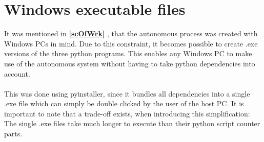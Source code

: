 \section{Windows executable files}
\label{exe}
It was mentioned in \textbf{\ref{scOfWrk} }, that the autonomous process was created with Windows PCs in mind. Due to this constraint, it becomes possible to create .exe versions of the three python programs. This enables any Windows PC to make use of the autonomous system without having to take python dependencies into account.
\\\\
This was done using pyinstaller, since it bundles all dependencies into a single .exe file which can simply be double clicked by the user of the host PC. It is important to note that a trade-off exists, when introducing this simplification: The single .exe files take much longer to execute than their python script counter parts.
